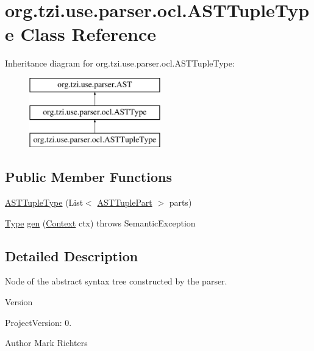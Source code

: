\hypertarget{classorg_1_1tzi_1_1use_1_1parser_1_1ocl_1_1_a_s_t_tuple_type}{\section{org.\-tzi.\-use.\-parser.\-ocl.\-A\-S\-T\-Tuple\-Type Class Reference}
\label{classorg_1_1tzi_1_1use_1_1parser_1_1ocl_1_1_a_s_t_tuple_type}
}
Inheritance diagram for org.\-tzi.\-use.\-parser.\-ocl.\-A\-S\-T\-Tuple\-Type\-:\begin{figure}[H]
\begin{center}
\leavevmode
\includegraphics[height=3.000000cm]{classorg_1_1tzi_1_1use_1_1parser_1_1ocl_1_1_a_s_t_tuple_type}
\end{center}
\end{figure}
\subsection*{Public Member Functions}
\begin{DoxyCompactItemize}
\item 
\hyperlink{classorg_1_1tzi_1_1use_1_1parser_1_1ocl_1_1_a_s_t_tuple_type_a427e9e78accca2e68d354bab63615148}{A\-S\-T\-Tuple\-Type} (List$<$ \hyperlink{classorg_1_1tzi_1_1use_1_1parser_1_1ocl_1_1_a_s_t_tuple_part}{A\-S\-T\-Tuple\-Part} $>$ parts)
\item 
\hyperlink{interfaceorg_1_1tzi_1_1use_1_1uml_1_1ocl_1_1type_1_1_type}{Type} \hyperlink{classorg_1_1tzi_1_1use_1_1parser_1_1ocl_1_1_a_s_t_tuple_type_a4286b17417f44110222e67b4e112cc9d}{gen} (\hyperlink{classorg_1_1tzi_1_1use_1_1parser_1_1_context}{Context} ctx)  throws Semantic\-Exception 
\end{DoxyCompactItemize}


\subsection{Detailed Description}
Node of the abstract syntax tree constructed by the parser.

\begin{DoxyVersion}{Version}

\end{DoxyVersion}
\begin{DoxyParagraph}{Project\-Version\-:}
0. 
\end{DoxyParagraph}
\begin{DoxyAuthor}{Author}
Mark Richters 
\end{DoxyAuthor}


